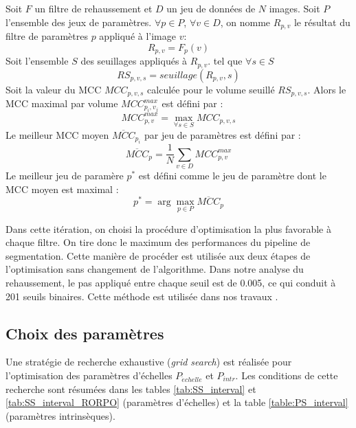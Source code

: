   Soit $F$ un filtre de rehaussement et $D$ un jeu de données de $N$ images. Soit $P$ l'ensemble des jeux de paramètres. 
  $\forall p \in P$, $\forall v \in D$, on nomme $R_{p,v}$ le résultat du filtre de paramètres $p$ appliqué à l'image $v$:
  \begin{equation}
    R_{p,v} = F_{p}(v)
  \end{equation}
  Soit l'ensemble $S$ des seuillages appliqués à $R_{p,v}$. tel que $\forall s \in S$ 
  \begin{equation}
    RS_{p,v,s} = seuillage(R_{p,v},s) 
  \end{equation}
  Soit la valeur du MCC $MCC_{p,v,s}$ calculée pour le volume seuillé $RS_{p,v,s}$.
  Alors le MCC maximal par volume $MCC_{p_i,v_j}^{max}$ est défini par :
  \begin{equation}
    MCC_{p,v}^{max} = \max_{\forall s \in S} MCC_{p,v,s}
  \end{equation}
  Le meilleur MCC moyen $\overline{MCC}_{p_i}$ par jeu de paramètres est défini par : 
  \begin{equation}
    \overline{MCC}_{p} = \frac{1}{N} \sum_{v \in D} MCC_{p,v}^{max}
  \end{equation}
  Le meilleur jeu de paramère $p^*$ est défini comme le jeu de paramètre dont le MCC moyen est maximal :
  \begin{equation}
    p^* = \arg\max_{p \in P} \overline{MCC}_{p}
  \end{equation}

  Dans cette itération, on choisi la procédure d'optimisation la plus favorable à chaque filtre. On tire donc le maximum des performances du pipeline de segmentation. Cette manière de procéder est utilisée aux deux étapes de l'optimisation sans changement de l'algorithme. Dans notre analyse du rehaussement, le pas appliqué entre chaque seuil est de 0.005, ce qui conduit à 201 seuils binaires. Cette méthode est utilisée dans nos travaux \cite{Lamy2022_TMI}.

  \subsection{Choix des paramètres}

Une stratégie de recherche exhaustive (\textit{grid search}) est réalisée pour l'optimisation des paramètres d'échelles $P_{\acute{e}chelle}$ et $P_{intr}$. Les conditions de cette recherche sont résumées dans les tables \ref{tab:SS_interval} et \ref{tab:SS_interval_RORPO} (paramètres d'échelles) et la table \ref{table:PS_interval} (paramètres intrinsèques).

